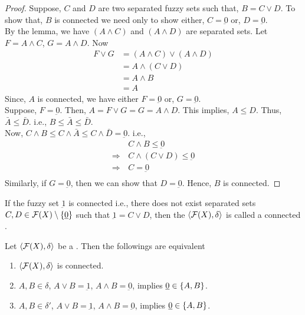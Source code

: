 \documentclass[../main-sheet.tex]{subfiles}
\begin{document}
\begin{proof}
    Suppose, \(C \) and \(D \) are two separated fuzzy sets such that, \(B=C\vee D \). To show that, \(B \) is connected we need only to show either, \(C=\underbar{0}\) or, \(D=\underbar{0}\).\\
    By the lemma, we have \((A\wedge C )\) and \((A\wedge D )\) are separated sets. Let \(F=A\wedge C \), \(G=A\wedge D \). Now
    \begin{align*}
        F\vee G&=(A\wedge C)\vee (A\wedge D)\\
        &=A\wedge (C\vee D)\\
        &=A\wedge B\\
        &=A
    \end{align*}
    Since, \(A \) is connected, we have either \(F=\underbar{0}\) or, \(G=\underbar{0}\).\\
    Suppose, \(F=\underbar{0}\). Then, \(A=F\vee G =G =A\wedge D    \). This implies, \(A\leq D\). Thus, \(\bar{A }\leq \bar{ D }\). i.e., \(B\leq\bar{A }\leq \bar{D }\).\\
    Now, \(C\wedge B\leq C\wedge\bar{A }\leq C\wedge \bar{D }=\underbar{0}\). i.e., \begin{align*}
        &C\wedge B\leq \underbar{0}\\
        \Rightarrow\,&C\wedge (C\vee D) \leq \underbar{0}\\
        \Rightarrow\,&C= \underbar{0}\\
    \end{align*}
    Similarly, if \(G=\underbar{0}\), then we can show that \(D=\underbar{0}\). Hence, \(B \) is connected.
\end{proof}
\begin{defn}
    If the fuzzy set \(\underbar{1}\) is connected i.e., there does not exist separated sets \(C, D\in\mathcal{F}(X)\setminus\{\underbar{0}\}\) such that \(\underbar{1}=C \vee D \), then the \fts \(\langle \mathcal{F}(X), \delta \rangle\) is called a connected \fts.
\end{defn}
\begin{thm}
    Let \(\langle \mathcal{F}(X), \delta \rangle\) be a \fts. Then the followings are equivalent
    \begin{enumerate}
        \item \(\langle \mathcal{F}(X), \delta \rangle\) is connected.
        \item \(A,B \in \delta\), \(A\vee B=\underbar{1}\), \(A\wedge B=\underbar{0}\), implies \(\underbar{0}\in\left\{A,B\right\}\).
        \item \(A,B \in \delta'\), \(A\vee B=\underbar{1}\), \(A\wedge B=\underbar{0}\), implies \(\underbar{0}\in\left\{A,B\right\}\).
    \end{enumerate}
\end{thm}
\end{document}
